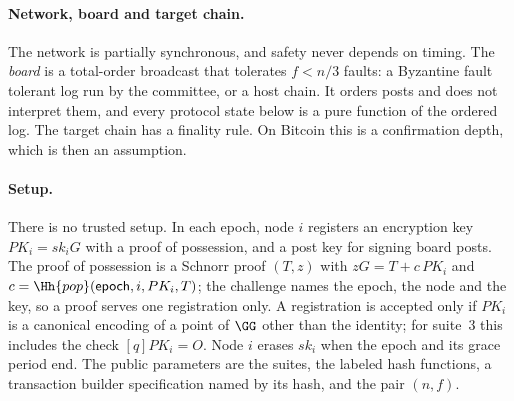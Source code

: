 \paragraph{Network, board and target chain.} The network is partially synchronous, and safety never depends on timing. The \emph{board} is a total-order broadcast that tolerates $f < n/3$ faults: a Byzantine fault tolerant log run by the committee, or a host chain. It orders posts and does not interpret them, and every protocol state below is a pure function of the ordered log. The target chain has a finality rule. On Bitcoin this is a confirmation depth, which is then an assumption.

\paragraph{Setup.} There is no trusted setup. In each epoch, node $i$ registers an encryption key $PK_i = sk_i G$ with a proof of possession, and a post key for signing board posts. The proof of possession is a Schnorr proof $(T, z)$ with $zG = T + c\,PK_i$ and $c = \Hh{pop}(\textsf{epoch}, i, PK_i, T)$; the challenge names the epoch, the node and the key, so a proof serves one registration only. A registration is accepted only if $PK_i$ is a canonical encoding of a point of $\GG$ other than the identity; for suite~3 this includes the check $[q]PK_i = O$. Node $i$ erases $sk_i$ when the epoch and its grace period end. The public parameters are the suites, the labeled hash functions, a transaction builder specification named by its hash, and the pair $(n,f)$.

